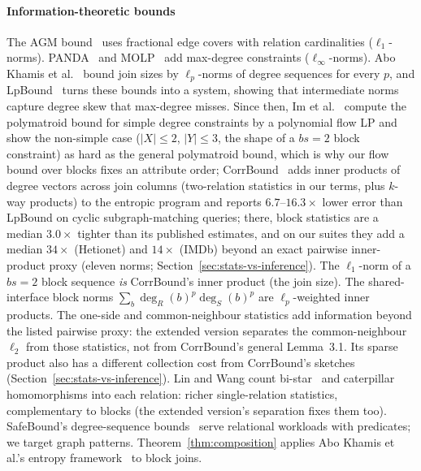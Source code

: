 \documentclass[sigconf, nonacm, acmthm=false]{acmart}
\begin{document}
\paragraph{Information-theoretic bounds}
The AGM bound~\cite{atserias2008agm} uses fractional edge covers
with relation cardinalities ($\ell_1$-norms).
PANDA~\cite{abokhamis2017panda} and MOLP~\cite{joglekar2016molp} add
max-degree constraints ($\ell_\infty$-norms).
Abo Khamis et al.~\cite{abokhamis2024lpnorm} bound join sizes by
$\ell_p$-norms of degree sequences for every $p$, and
LpBound~\cite{zhang2025lpbound} turns these bounds into a system,
showing that intermediate norms capture degree skew that max-degree
misses.
Since then, Im et al.~\cite{im2025simple} compute the polymatroid bound for simple degree
constraints by a polynomial flow LP and show the non-simple case
($|X|{\le}2$, $|Y|{\le}3$, the shape of a $bs{=}2$ block constraint)
as hard as the general polymatroid bound, which is why our flow bound over blocks fixes an attribute order;
CorrBound~\cite{mayer2026corrbound} adds inner products of degree
vectors across join columns (two-relation statistics in our
terms, plus $k$-way products) to the entropic program and reports $6.7$--$16.3\times$ lower error than LpBound on cyclic subgraph-matching queries; there, block statistics are a median $3.0\times$ tighter than its published estimates, and on our suites they add a median $34\times$ (Hetionet) and $14\times$ (IMDb) beyond an exact pairwise inner-product proxy (eleven norms; Section~\ref{sec:stats-vs-inference}).  The
$\ell_1$-norm of a $bs{=}2$ block sequence \emph{is} CorrBound's inner
product (the join size).  The shared-interface block norms
$\sum_b \deg_R(b)^p\deg_S(b)^p$ are $\ell_p$-weighted inner products.
The one-side and common-neighbour statistics add information beyond the listed pairwise proxy: the extended version separates the common-neighbour $\ell_2$ from those statistics, not from CorrBound's general Lemma~3.1. Its sparse product also has a different collection cost from CorrBound's sketches (Section~\ref{sec:stats-vs-inference}).
Lin and Wang count bi-star~\cite{lin2025ambidextrous} and caterpillar~\cite{lin2026sidorenko} homomorphisms into each relation: richer single-relation statistics, complementary to blocks (the extended version's separation fixes them too).
SafeBound's degree-sequence bounds~\cite{deeds2023dsb} serve relational
workloads with predicates; we target graph patterns. Theorem~\ref{thm:composition}
applies Abo Khamis et al.'s entropy framework~\cite{abokhamis2024lpnorm} to block joins.
\end{document}
